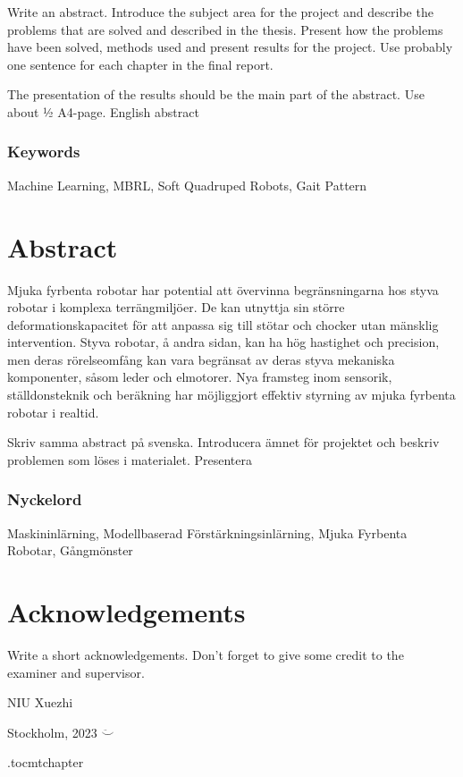 Write an abstract. Introduce the subject area for the project and describe the problems that are solved and described in the thesis. Present how the problems have been solved, methods used and present results for the project. Use probably one sentence for each chapter in the final report.

The presentation of the results should be the main part of the abstract. Use about ½ A4-page.
English abstract



\vspace{2cm}
\subsection*{Keywords}
Machine Learning, \ac{MBRL}, Soft Quadruped Robots, Gait Pattern





\newpage
\thispagestyle{plain}
\chapter*{Abstract}
Mjuka fyrbenta robotar har potential att övervinna begränsningarna hos styva robotar i komplexa terrängmiljöer. De kan utnyttja sin större deformationskapacitet för att anpassa sig till stötar och chocker utan mänsklig intervention. Styva robotar, å andra sidan, kan ha hög hastighet och precision, men deras rörelseomfång kan vara begränsat av deras styva mekaniska komponenter, såsom leder och elmotorer. Nya framsteg inom sensorik, ställdonsteknik och beräkning har möjliggjort effektiv styrning av mjuka fyrbenta robotar i realtid.


Skriv samma abstract på svenska. Introducera ämnet för projektet och beskriv problemen som löses i materialet. Presentera 

\subsection*{Nyckelord}
Maskininlärning, Modellbaserad Förstärkningsinlärning, Mjuka Fyrbenta Robotar, Gångmönster


\newpage
\thispagestyle{plain}
\chapter*{Acknowledgements}
Write a short acknowledgements. Don't forget to give some credit to the examiner and supervisor.

\vspace{2cm}
\hfill NIU Xuezhi 

\hfill Stockholm, \monthname{ }2023 $\ddot\smile$

\newpage



\newpage

\etocdepthtag.toc{mtchapter}
\thispagestyle{plain}
\tableofcontents

\newpage


